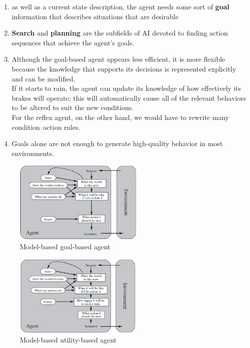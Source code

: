 \begin{enumerate}
    \item as well as a current state description, the agent needs some sort of \textbf{goal} information that describes situations that are desirable

    \item \textbf{Search} and \textbf{planning} are the subfields of AI devoted to finding action sequences that achieve the agent’s goals.

    \item Although the goal-based agent appears less efficient, it is more flexible because the knowledge that supports its decisions is represented explicitly and can be modified.\\
    If it starts to rain, the agent can update its knowledge of how effectively its brakes will operate; this will automatically cause all of the relevant behaviors to be altered to suit the new conditions.\\
    For the reflex agent, on the other hand, we would have to rewrite many condition–action rules. 

    \item Goals alone are not enough to generate high-quality behavior in most environments.
\end{enumerate}


\begin{table}[h]
    \begin{minipage}{0.49\linewidth}
        \begin{figure}[H]
            \centering
            \includegraphics[width=\linewidth, height=4cm, keepaspectratio]{Pictures/ai-ml/agent--model-based-goal-based.png}
            \caption{Model-based goal-based agent \cite{aci-1}}
        \end{figure}
    \end{minipage}
    \hfill
    \begin{minipage}{0.49\linewidth}
        \begin{figure}[H]
            \centering
            \includegraphics[width=\linewidth, height=4cm, keepaspectratio]{Pictures/ai-ml/agent--model-based-utility-based.png}
            \caption{Model-based utility-based agent \cite{aci-1}}
        \end{figure}
    \end{minipage}
\end{table}

